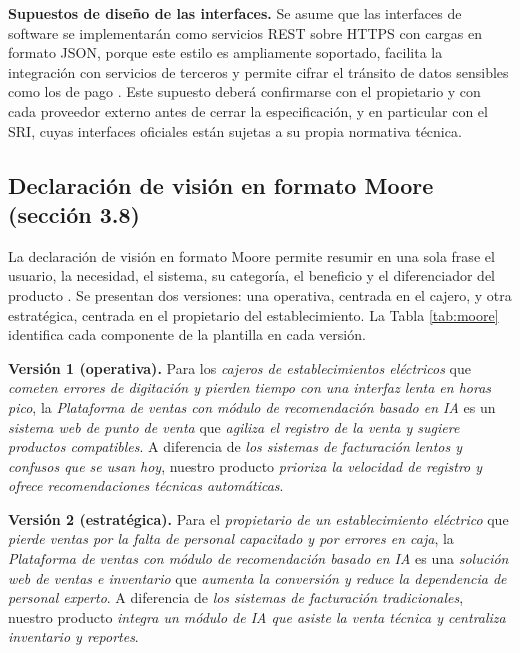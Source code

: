 \documentclass[onecolumn,12pt]{IEEEtran}
\begin{document}
\textbf{Supuestos de dise\~no de las interfaces.} Se asume que las interfaces de software se implementar\'an como servicios REST sobre HTTPS con cargas en formato JSON, porque este estilo es ampliamente soportado, facilita la integraci\'on con servicios de terceros y permite cifrar el tr\'ansito de datos sensibles como los de pago \cite{iso29148,iso15288}. Este supuesto deber\'a confirmarse con el propietario y con cada proveedor externo antes de cerrar la especificaci\'on, y en particular con el SRI, cuyas interfaces oficiales est\'an sujetas a su propia normativa t\'ecnica.

\subsection{Declaraci\'on de visi\'on en formato Moore (secci\'on 3.8)}
La declaraci\'on de visi\'on en formato Moore permite resumir en una sola frase el usuario, la necesidad, el sistema, su categor\'ia, el beneficio y el diferenciador del producto \cite{moore}. Se presentan dos versiones: una operativa, centrada en el cajero, y otra estrat\'egica, centrada en el propietario del establecimiento. La Tabla \ref{tab:moore} identifica cada componente de la plantilla en cada versi\'on.

\noindent\textbf{Versi\'on 1 (operativa).} Para los \emph{cajeros de establecimientos el\'ectricos} que \emph{cometen errores de digitaci\'on y pierden tiempo con una interfaz lenta en horas pico}, la \emph{Plataforma de ventas con m\'odulo de recomendaci\'on basado en IA} es un \emph{sistema web de punto de venta} que \emph{agiliza el registro de la venta y sugiere productos compatibles}. A diferencia de \emph{los sistemas de facturaci\'on lentos y confusos que se usan hoy}, nuestro producto \emph{prioriza la velocidad de registro y ofrece recomendaciones t\'ecnicas autom\'aticas}.

\noindent\textbf{Versi\'on 2 (estrat\'egica).} Para el \emph{propietario de un establecimiento el\'ectrico} que \emph{pierde ventas por la falta de personal capacitado y por errores en caja}, la \emph{Plataforma de ventas con m\'odulo de recomendaci\'on basado en IA} es una \emph{soluci\'on web de ventas e inventario} que \emph{aumenta la conversi\'on y reduce la dependencia de personal experto}. A diferencia de \emph{los sistemas de facturaci\'on tradicionales}, nuestro producto \emph{integra un m\'odulo de IA que asiste la venta t\'ecnica y centraliza inventario y reportes}.
\end{document}
